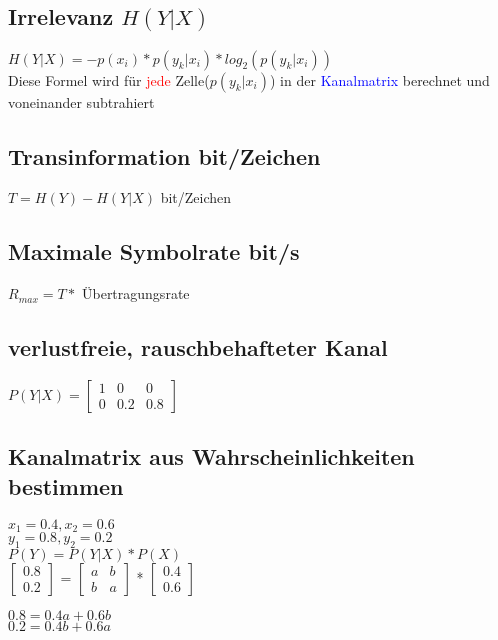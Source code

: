 \subsection{Irrelevanz $H(Y|X)$}


\colorbox{lightlightgrey}{$H(Y|X) = -p(x_i)*p(y_k|x_i) * log_2(p(y_k|x_i))$}\\
Diese Formel wird für \textcolor{red}{jede} Zelle($p(y_k|x_i)$) in der \textcolor{blue}{Kanalmatrix} berechnet und voneinander subtrahiert
\subsection{Transinformation bit/Zeichen}
\colorbox{lightlightgrey}{$T = H(Y) - H(Y|X)$ bit/Zeichen}



\subsection{Maximale Symbolrate bit/s}
$R_{max} = T *$ Übertragungsrate
\subsection{verlustfreie, rauschbehafteter Kanal}
$P(Y|X) = \begin{bmatrix}
              1 & 0 & 0\\
              0 & 0.2 & 0.8
\end{bmatrix}$



\subsection{Kanalmatrix aus Wahrscheinlichkeiten bestimmen}
\begin{minipage}[t]{0.15\textwidth}
    $x_1 = 0.4, x_2 = 0.6$\\
    $y_1 = 0.8, y_2 = 0.2$\\
    \colorbox{lightlightgrey}{$P(Y) = P(Y|X) * P(X)$}\\
    \colorbox{lightlightgrey}{$\begin{bmatrix}
                                   0.8\\
                                   0.2
    \end{bmatrix}$ =
    $\begin{bmatrix}
         a & b\\
         b & a
    \end{bmatrix}$ *
    $\begin{bmatrix}
         0.4\\
         0.6
    \end{bmatrix}$}
\end{minipage}
\hfill
\begin{minipage}[t]{0.15\textwidth}
    $0.8 = 0.4a + 0.6b$\\
    $0.2 = 0.4b + 0.6a$\\
\end{minipage}

\vfill
$$
\columnbreak






